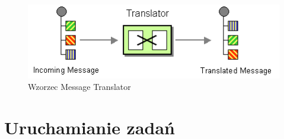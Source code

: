 \begin{figure}[!h]
 \centering
 \includegraphics[width=1.0\textwidth]{eip/MessageTranslator}
 \caption{Wzorzec Message Translator}
 \label{fig:messageTranslator}
\end{figure}

\section{Uruchamianie zadań}
